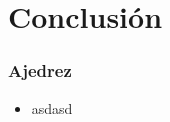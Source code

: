 
\section{Conclusión}

\begin{frame}
\frametitle{Ajedrez}

\begin{itemize}
\item asdasd
\end{itemize}

\end{frame}
